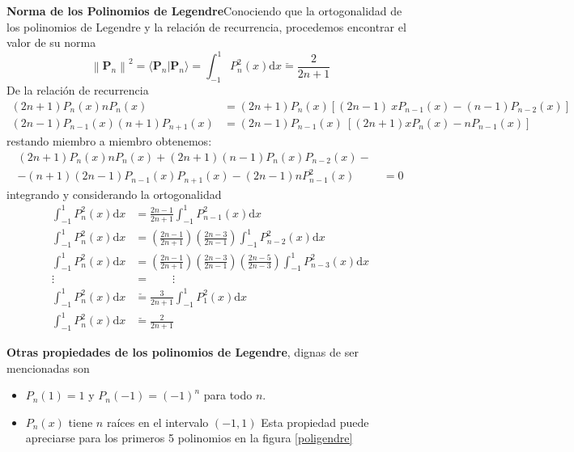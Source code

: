 \documentclass[spanish,notitlepage,letterpaper,12pt]{article}
\begin{document}
\textbf{Norma de los Polinomios de Legendre}\newline Conociendo que la
ortogonalidad de los polinomios de Legendre y la relaci\'{o}n de recurrencia,
procedemos encontrar el valor de su norma
\[
\left\|  \mathbf{P}_{n}\right\|  ^{2}=\langle\mathbf{P}_{n}|\mathbf{P}%
_{n}\rangle=\int_{-1}^{1}P_{n}^{2}(x)\mathrm{d}x\check{=}\frac2{2n+1}
\]
De la relaci\'{o}n de recurrencia
\begin{align*}
\left(  2n+1\right)  P_{n}(x)nP_{n}(x)  & =\left(  2n+1\right)  P_{n}%
(x)\left[  \left(  2n-1\right)  \ xP_{n-1}(x)-\left(  n-1\right)
P_{n-2}(x)\right] \\
\left(  2n-1\right)  P_{n-1}(x)\left(  n+1\right)  P_{n+1}(x)  & =\left(
2n-1\right)  P_{n-1}(x)\ \left[  \left(  2n+1\right)  xP_{n}(x)-nP_{n-1}%
(x)\right]
\end{align*}
restando miembro a miembro obtenemos:
\begin{align*}
\left(  2n+1\right)  P_{n}(x)nP_{n}(x)+\left(  2n+1\right)  \left(
n-1\right)  P_{n}(x)P_{n-2}(x)-\  & \\
-\left(  n+1\right)  \left(  2n-1\right)  P_{n-1}(x)P_{n+1}(x)-\left(
2n-1\right)  nP_{n-1}^{2}(x)  & =0
\end{align*}
integrando y considerando la ortogonalidad
\begin{align*}
\int_{-1}^{1}P_{n}^{2}(x)\mathrm{d}x  & =\frac{2n-1}{2n+1}\int_{-1}^{1}%
P_{n-1}^{2}(x)\mathrm{d}x\\
\int_{-1}^{1}P_{n}^{2}(x)\mathrm{d}x  & =\left(  \frac{2n-1}{2n+1}\right)
\left(  \frac{2n-3}{2n-1}\right)  \int_{-1}^{1}P_{n-2}^{2}(x)\mathrm{d}x\\
\int_{-1}^{1}P_{n}^{2}(x)\mathrm{d}x  & =\left(  \frac{2n-1}{2n+1}\right)
\left(  \frac{2n-3}{2n-1}\right)  \left(  \frac{2n-5}{2n-3}\right)  \int
_{-1}^{1}P_{n-3}^{2}(x)\mathrm{d}x\\
\vdots\qquad & =\qquad\vdots\\
\int_{-1}^{1}P_{n}^{2}(x)\mathrm{d}x  & \check{=}\frac3{2n+1}\int_{-1}%
^{1}P_{1}^{2}(x)\mathrm{d}x\\
\int_{-1}^{1}P_{n}^{2}(x)\mathrm{d}x  & \check{=}\frac2{2n+1}%
\end{align*}

\textbf{Otras propiedades de los polinomios de Legendre}, dignas de ser
mencionadas son

\begin{itemize}
\item $P_{n}(1)=1$ y $P_{n}(-1)=(-1)^{n}$ para todo $n.$

\item $P_{n}(x)$ tiene $n$ ra\'{i}ces en el intervalo $\left(  -1,1\right)  $
Esta propiedad puede apreciarse para los primeros 5 polinomios en la figura \ref{poligendre}
\end{itemize}
\end{document}
